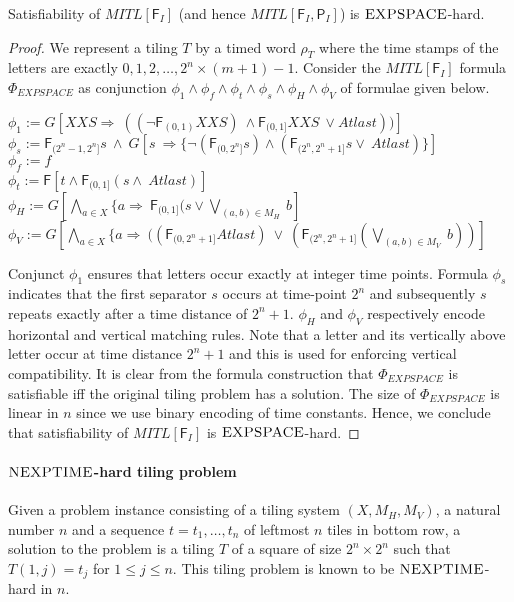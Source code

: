 \documentclass{llncs}
\newcommand{\class}{\textsc}
\newcommand{\fut}{\textsf{F}}
\newcommand{\past}{\textsf{P}}
\newcommand{\mitlfp}{\mbox{$\mathit{MITL[\fut_I,\past_I]}$}}
\newcommand{\mitlf}{\mbox{$\mathit{MITL[\fut_I]}$}}
\newcommand{\expspace}{\mbox{$\class{EXPSPACE}$}}
\newcommand{\nexptime}{\mbox{$\class{NEXPTIME}$}}
\begin{document}
\begin{theorem}\label{theo:expspacehard} 
Satisfiability of $\mitlf$ (and hence $\mitlfp$) is \expspace-hard.
\end{theorem}
\begin{proof}
We represent a tiling $T$ by a timed word $\rho_T$ where the time stamps of the letters are exactly $0,1,2, \ldots, 2^n\times(m+1)-1$. Consider the $\mitlf$ formula $\Phi_{EXPSPACE}$ as conjunction $\phi_1 \land \phi_f \land \phi_t \land \phi_s \land \phi_H\land \phi_V$ of formulae given below. 

\medskip

\noindent $\phi_1 := G [XXS \Rightarrow~ ((\neg\fut_{(0,1)}XXS) ~ \land \fut_{(0,1]} XXS ~\lor Atlast))]$\\
$\phi_s := \fut_{(2^n-1,2^n]} s ~\land ~ G [s ~\Rightarrow \{\neg(\fut_{(0,2^n]}s) \land (\fut_{(2^n,2^n+1]}s\lor ~Atlast)\}]$\\
$\phi_f := f$\\
$\phi_t := \fut [t\land\fut_{(0,1]}(s\land~ Atlast)]$\\ 
$\phi_H := G [\bigwedge\limits_{a\in X}\{a\Rightarrow~ \fut_{(0,1]}(s \lor \bigvee\limits_{(a,b) \in M_H}~b]$\\
$\phi_V := G [\bigwedge\limits_{a\in X}\{a\Rightarrow~ (( \fut_{(0,2^n+1]} Atlast) ~\lor~ (\fut_{(2^n,2^n+1]}(\bigvee\limits_{(a,b)\in M_V} ~b))]$
\medskip

Conjunct $\phi_1$ ensures that letters occur exactly at integer time points. Formula $\phi_s$ indicates that the first separator $s$ occurs at time-point $2^n$ and subsequently $s$ repeats exactly after a time distance of $2^n+1$. $\phi_H$ and $\phi_V$ respectively encode horizontal and vertical matching rules.
 Note that a letter and its vertically above letter occur at time distance $2^n+1$ and this is used for enforcing vertical compatibility.
It is clear from the formula construction that  $\Phi_{EXPSPACE}$
is satisfiable iff the original tiling problem has a solution. The size of $\Phi_{EXPSPACE}$ is linear in $n$ since we use binary encoding of time constants. Hence, we conclude that satisfiability of $\mitlf$ is \expspace-hard.
\end{proof}

\paragraph{\nexptime-hard tiling problem} Given a problem instance consisting of a tiling system
$(X,M_H,M_V)$, a natural number $n$ and a sequence $t=t_1,\ldots,t_n$ of leftmost $n$ tiles in bottom row, a solution to the problem is a tiling $T$ of a square of size $2^n\times 2^n$ such that $T(1,j)=t_j$ for $1 \leq j \leq n$. This tiling problem is known to be \nexptime-hard in $n$.
\end{document}
